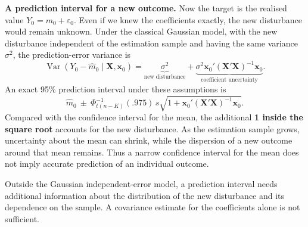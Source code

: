 \documentclass[
  11pt,
]{book}
\theoremstyle{definition}
\theoremstyle{definition}
\theoremstyle{definition}
\theoremstyle{definition}
\theoremstyle{remark}
\begin{document}
\textbf{A prediction interval for a new outcome.} Now the target is the realised value \(Y_0=m_0+\varepsilon_0\). Even if we knew the coefficients exactly, the new disturbance would remain unknown. Under the classical Gaussian model, with the new disturbance independent of the estimation sample and having the same variance \(\sigma^2\), the prediction-error variance is
\[
\operatorname{Var}(Y_0-\widehat m_0\mid\mathbf{X},\mathbf{x}_0)
=\underbrace{\sigma^2}_{\text{new disturbance}}
+\underbrace{\sigma^2\mathbf{x}_0'(\mathbf{X}'\mathbf{X})^{-1}\mathbf{x}_0}_{\text{coefficient uncertainty}}.
\]
An exact 95\% prediction interval under these assumptions is
\begin{equation}
\widehat m_0\ \pm\ \Phi^{-1}_{t(n-K)}(.975)\,s
\sqrt{1+\mathbf{x}_0'(\mathbf{X}'\mathbf{X})^{-1}\mathbf{x}_0}.\label{eq:regression-prediction-interval}
\end{equation}
Compared with the confidence interval for the mean, the additional \textbf{1 inside the square root} accounts for the new disturbance. As the estimation sample grows, uncertainty about the mean can shrink, while the dispersion of a new outcome around that mean remains. Thus a narrow confidence interval for the mean does not imply accurate prediction of an individual outcome.

Outside the Gaussian independent-error model, a prediction interval needs additional information about the distribution of the new disturbance and its dependence on the sample. A covariance estimate for the coefficients alone is not sufficient.
\end{document}
